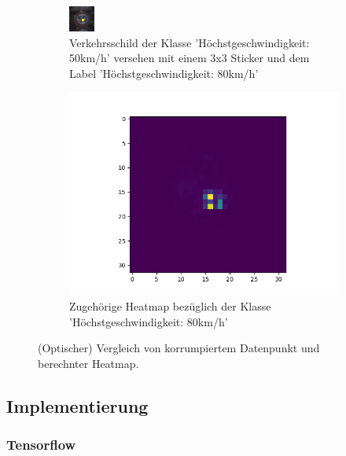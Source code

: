 \documentclass[twoside, 12pt,a4paper]{article}
\numberwithin{equation}{section}
\begin{document}
	\begin{figure}
		\centering
		\begin{subfigure}{.5\textwidth}
			\centering
			\includegraphics[width=.4\linewidth]{1450_poison}
			\caption{Verkehrsschild der Klasse 'Höchstgeschwindigkeit: 50km/h' versehen mit einem 3x3 Sticker und dem Label 'Höchstgeschwindigkeit: 80km/h'}
			
		\end{subfigure}%
		\begin{subfigure}{.5\textwidth}
			\centering
			\includegraphics[width=.7\linewidth]{1450_poison_lrp.png}
			\caption{Zugehörige Heatmap bezüglich der Klasse 'Höchstgeschwindigkeit: 80km/h'}
			
		\end{subfigure}
		\caption{(Optischer) Vergleich von korrumpiertem Datenpunkt und berechnter Heatmap.}
		\label{vergleich_original_lrp}
	\end{figure}
	\subsection{Implementierung}
	
	\subsubsection{Tensorflow}
\end{document}
